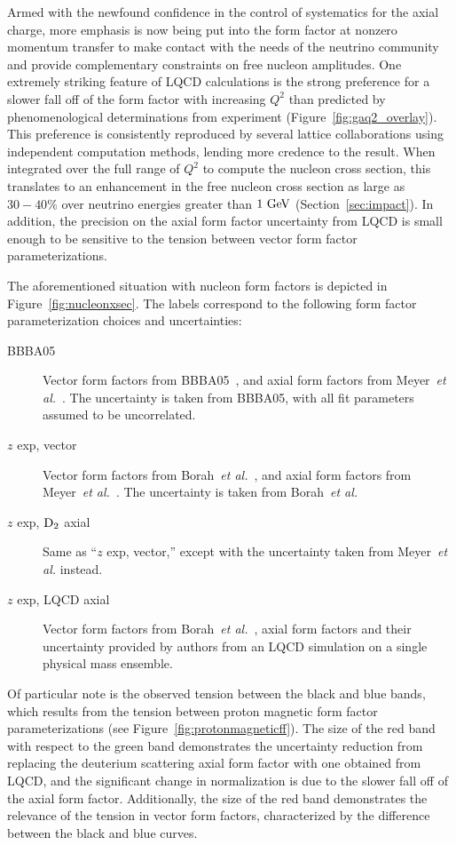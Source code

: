 Armed with the newfound confidence in the control of systematics for the axial charge,
 more emphasis is now being put into the form factor at nonzero momentum transfer
to make contact with the needs of the neutrino community and provide
 complementary constraints on free nucleon amplitudes.
One extremely striking feature of LQCD calculations is the strong preference for a slower
fall off of the form factor with increasing $Q^2$ than predicted by phenomenological determinations from experiment (Figure~\ref{fig:gaq2_overlay}).
This preference is consistently reproduced by several lattice collaborations using
independent computation methods, lending more credence to the result.
When integrated over the full range of $Q^2$ to compute the nucleon cross section,
this translates to an enhancement in the free nucleon cross section as large as $30-40\%$
over neutrino energies greater than $1~{\rm GeV}$ (Section~\ref{sec:impact}).
In addition, the precision on the axial form factor uncertainty from LQCD
is small enough to be sensitive to the tension between vector form factor parameterizations.

The aforementioned situation with nucleon form factors is depicted in Figure~\ref{fig:nucleonxsec}.
The labels correspond to the following form factor parameterization choices and uncertainties:
\begin{description}
 \item[BBBA05] Vector form factors from BBBA05~\cite{Bradford:2006yz},
 and axial form factors from Meyer~{\it et al.}~\cite{Meyer:2016oeg}.
 The uncertainty is taken from BBBA05, with all fit parameters assumed to be uncorrelated.
 \item[$z$ exp, vector] Vector form factors from Borah~{\it et al.}~\cite{Borah:2020gte},
 and axial form factors from Meyer~{\it et al.}~\cite{Meyer:2016oeg}.
 The uncertainty is taken from Borah~{\it et al.}
 \item[$z$ exp, ${\rm D}_{2}$ axial] Same as ``$z$ exp, vector,''
 except with the uncertainty taken from Meyer~{\it et al.} instead.
 \item[$z$ exp, LQCD axial] Vector form factors from Borah~{\it et al.}~\cite{Borah:2020gte},
 axial form factors and their uncertainty provided by authors from an LQCD simulation
 on a single physical mass ensemble.
\end{description}
Of particular note is the observed tension between the black and blue bands,
 which results from the tension between proton magnetic form factor parameterizations
 (see Figure~\ref{fig:protonmagneticff}).
The size of the red band with respect to the green band demonstrates the uncertainty reduction from replacing the deuterium scattering axial form factor with one obtained from LQCD, and the significant change in normalization is due to the slower fall off of the axial form factor.
Additionally, the size of the red band demonstrates the relevance of the tension in vector form factors, characterized by the difference between the black and blue curves.

